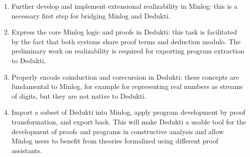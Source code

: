 
\begin{enumerate}
\item Further develop and implement extensional realizability in Minlog: this is
  a necessary first step for bridging Minlog and Dedukti.
\item Express the core Minlog logic and proofs in Dedukti: this task is
  facilitated by the fact that both systems share proof terms and deduction
  modulo. The preliminary work on realizability is required for exporting
  program extraction to Dedukti.
\item Properly encode coinduction and corecursion in Dedukti: these concepts are
  fundamental to Minlog, for example for representing real numbers as streams of
  digits, but they are not native to Dedukti.
\item Import a subset of Dedukti into Minlog, apply program development by proof
  transformation, and export back. This will make Dedukti a usable tool for the
  development of proofs and programs in constructive analysis and allow Minlog
  users to benefit from theories formalized using different proof assistants.
\end{enumerate}




